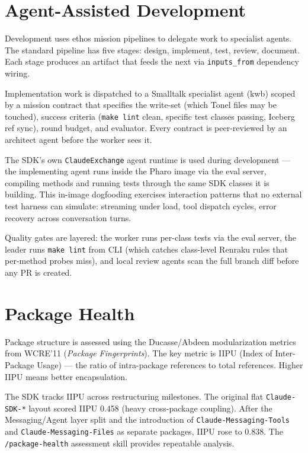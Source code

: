 \documentclass[a4paper,10pt,fleqn]{article}
\newcommand{\cls}[1]{\texttt{#1}}
\begin{document}
\section{Agent-Assisted Development}

Development uses ethos mission pipelines to delegate work to specialist
agents.  The standard pipeline has five stages: design, implement, test,
review, document.  Each stage produces an artifact that feeds the next
via \texttt{inputs\_from} dependency wiring.

Implementation work is dispatched to a Smalltalk specialist agent (kwb)
scoped by a mission contract that specifies the write-set (which Tonel
files may be touched), success criteria (\texttt{make lint} clean,
specific test classes passing, Iceberg ref sync), round budget, and
evaluator.  Every contract is peer-reviewed by an architect agent before
the worker sees it.

The SDK's own \cls{ClaudeExchange} agent runtime is used during
development --- the implementing agent runs inside the Pharo image via
the eval server, compiling methods and running tests through the same
SDK classes it is building.  This in-image dogfooding exercises
interaction patterns that no external test harness can simulate:
streaming under load, tool dispatch cycles, error recovery across
conversation turns.

Quality gates are layered: the worker runs per-class tests via the eval
server, the leader runs \texttt{make lint} from CLI (which catches
class-level Renraku rules that per-method probes miss), and local review
agents scan the full branch diff before any PR is created.

\section{Package Health}

Package structure is assessed using the Ducasse/Abdeen modularization
metrics from WCRE'11 (\emph{Package Fingerprints}).  The key metric is
IIPU (Index of Inter-Package Usage) --- the ratio of intra-package
references to total references.  Higher IIPU means better encapsulation.

The SDK tracks IIPU across restructuring milestones.  The original flat
\texttt{Claude-SDK-*} layout scored IIPU 0.458 (heavy cross-package
coupling).  After the Messaging/Agent layer split and the introduction
of \texttt{Claude-Messaging-Tools} and \texttt{Claude-Messaging-Files}
as separate packages, IIPU rose to 0.838.  The \texttt{/package-health}
assessment skill provides repeatable analysis.
\end{document}
